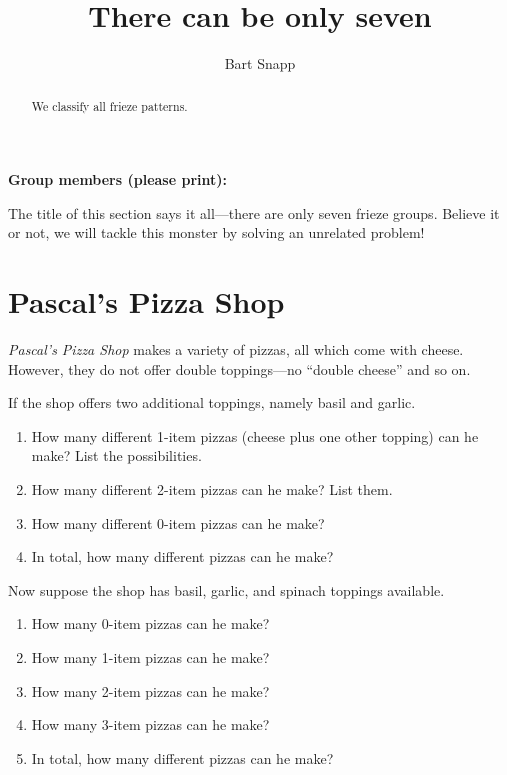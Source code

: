 \documentclass[nooutcomes,noauthor]{ximera}
\title{There can be only seven}
\author{Bart Snapp}
\begin{document}
\begin{abstract}
  We classify all frieze patterns.
\end{abstract}
\maketitle

\noindent\textbf{Group members (please print):}\ \hrulefill \\

\hrulefill

The title of this section says it all---there are only seven frieze
groups. Believe it or not, we will tackle this monster by solving an
unrelated problem!

\section{Pascal's Pizza Shop}

\textit{Pascal's Pizza Shop} makes a variety of pizzas, all which come
with cheese.  However, they do not offer double toppings---no ``double
cheese'' and so on.

\begin{problem}
If the shop offers two additional toppings, namely basil and garlic.
\begin{enumerate}
\item How many different 1-item pizzas (cheese plus one other
  topping) can he make?  List the possibilities.
\item How many different 2-item pizzas can he make?  List them.
\item How many different 0-item pizzas can he make?
\item In total, how many different pizzas can he make?
\end{enumerate}
\end{problem}


\begin{problem}
Now suppose the shop has basil, garlic, and spinach toppings
available.
\begin{enumerate}
\item How many 0-item pizzas can he make?
\item How many 1-item pizzas can he make?
\item How many 2-item pizzas can he make?
\item How many 3-item pizzas can he make?
\item In total, how many different pizzas can he make?
\end{enumerate}
\end{problem}
\end{document}
